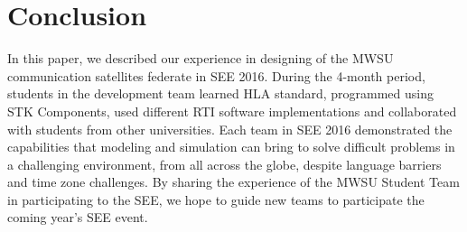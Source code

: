\documentclass[journal, onecolumn]{IEEEtran}
\begin{document}
\section{Conclusion}
In this paper, we described our experience in designing of the MWSU communication satellites federate in SEE 2016. During the 4-month period, students in the development team learned HLA standard, programmed using STK Components, used different RTI software implementations and collaborated with students from other universities. Each team in SEE 2016 demonstrated the capabilities that modeling and simulation can bring to solve difficult problems in a challenging environment, from all across the globe, despite language barriers and time zone challenges. By sharing the experience of the MWSU Student Team in participating to the SEE, we hope to guide new teams to participate the coming year\rq{}s SEE event.






%
%







\end{document}
